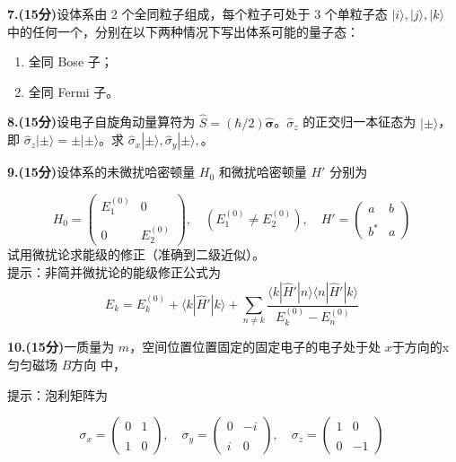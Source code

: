 \textbf{7.(15分)}设体系由 2 个全同粒子组成，每个粒子可处于 3 个单粒子态 $|i\rangle, |j\rangle, |k\rangle$ 中的任何一个，分别在以下两种情况下写出体系可能的量子态：
\begin{enumerate}
    \item 全同 Bose 子；
    \item 全同 Fermi 子。
\end{enumerate}

\textbf{8.(15分)}设电子自旋角动量算符为 $\hat{S} = (\hbar/2) \hat{\mathbf{\sigma}}$。$\hat{\sigma}_z$ 的正交归一本征态为 $|\pm\rangle$，即 $\hat{\sigma}_z|\pm\rangle = \pm|\pm\rangle$。求 $\hat{\sigma}_x|\pm\rangle, \hat{\sigma}_y|\pm\rangle, $。

\textbf{9.(15分)}设体系的未微扰哈密顿量 $H_0$ 和微扰哈密顿量 $H'$ 分别为

\begin{equation}
H_0 = \begin{pmatrix} E_1^{(0)} & 0 \\\\ 0 & E_2^{(0)} \end{pmatrix}, \quad (E_1^{(0)} \neq E_2^{(0)}), \quad H' = \begin{pmatrix} a & b \\\\ b^* & a \end{pmatrix}~
\end{equation}
试用微扰论求能级的修正（准确到二级近似）。\\
提示：非简并微扰论的能级修正公式为\\
\begin{equation}
E_k = E_k^{(0)} + \langle k | \hat H' | k \rangle + \sum_{n \neq k} \frac{\langle k | \hat H' | n \rangle \langle n |\hat H' | k \rangle}{E_k^{(0)} - E_n^{(0)}}~
\end{equation}

\textbf{10.(15分)}一质量为 $m$，空间位置位置固定的固定电子的电子处于处 $x$于方向的x匀匀磁场 $ B$方向 中，


提示：泡利矩阵为

$$\sigma_x = \begin{pmatrix}0 & 1 \\\\1 & 0\end{pmatrix}, \quad\sigma_y = \begin{pmatrix}0 & -i \\\\i & 0\end{pmatrix}, \quad\sigma_z = \begin{pmatrix}1 & 0 \\\\0 & -1\end{pmatrix}~$$